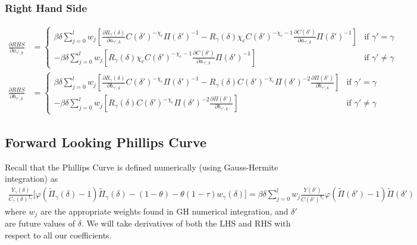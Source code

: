 \documentclass[11pt]{article}
\begin{document}
\subsubsection*{Right Hand Side}
\begin{align}
\frac{\partial RHS}{\partial a_{\gamma',k}} &= 
\begin{cases}
\beta\delta\sum_{j = 0}^{l}w_j\left[\frac{\partial R_{\gamma}(\delta)}{\partial a_{\gamma',k}} C(\delta')^{-\chi_{c}}\Pi(\delta')^{-1} - R_{\gamma}(\delta)\chi_{c}C(\delta')^{-\chi_{c}-1}\frac{\partial C(\delta')}{\partial a_{\gamma',k}}\Pi(\delta')^{-1}\right]& \text{if } \gamma' = \gamma \\
-\beta\delta\sum_{j = 0}^{l}w_j\left[R_{\gamma}(\delta)\chi_{c}C(\delta')^{-\chi_{c}-1}\frac{\partial C(\delta')}{\partial a_{\gamma',k}}\Pi(\delta')^{-1}\right] & \text{if } \gamma' \neq \gamma 
\end{cases}\\
\frac{\partial RHS}{\partial b_{\gamma',k}} &=
\begin{cases}  
\beta\delta\sum_{j = 0}^{l}w_j\left[\frac{\partial R_{\gamma}(\delta)}{\partial b_{\gamma',k}} C(\delta')^{-\chi_{c}}\Pi(\delta')^{-1} - R_{\gamma}(\delta)C(\delta')^{-\chi_{c}}\Pi(\delta')^{-2}\frac{\partial \Pi(\delta')}{\partial b_{\gamma',k}}\right]& \text{if } \gamma' = \gamma \\
-\beta\delta\sum_{j = 0}^{l}w_j\left[R_{\gamma}(\delta)C(\delta')^{-\chi_{c}}\Pi(\delta')^{-2}\frac{\partial \Pi(\delta')}{\partial b_{\gamma',k}}\right] & \text{if } \gamma' \neq \gamma
\end{cases} 
\end{align}

\subsection*{Forward Looking Phillips Curve}
\noindent 
Recall that the Phillips Curve is defined numerically (using Gauss-Hermite integration) as 
\begin{align}
\frac{Y_{\gamma}(\delta)}{C_{\gamma}(\delta)^{\chi_{c}}}\bigl[ \varphi (\tilde{\Pi}_{\gamma}(\delta) - 1)\tilde{\Pi}_{\gamma}(\delta) - (1 - \theta) - \theta (1-\tau)w_{\gamma}(\delta)\bigr] =  \beta\delta\sum_{j = 0}^{l}w_j\frac{Y(\delta')}{C(\delta')^{\chi_{c}}}\varphi (\tilde{\Pi}(\delta') - 1)\tilde{\Pi}(\delta')
\end{align}
where $w_j$ are the appropriate weights found in GH numerical integration, and $\delta'$ are future values of $\delta$. We will take derivatives of both the LHS and RHS with respect to all our coefficients.
\end{document}
